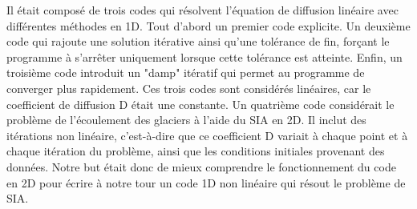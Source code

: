 \documentclass{article}
\begin{document}
 Il était composé de trois codes qui résolvent l'équation de diffusion linéaire avec différentes méthodes en 1D. Tout d'abord un premier code explicite. Un deuxième code qui rajoute une solution itérative ainsi qu'une tolérance de fin, forçant le programme à s'arrêter uniquement lorsque cette tolérance est atteinte. Enfin, un troisième code introduit un "damp" itératif qui permet au programme de converger plus rapidement.
\newline
Ces trois codes sont considérés linéaires, car le coefficient de diffusion D était une constante.
\newline
Un quatrième code considérait le problème de l'écoulement des glaciers à l'aide du SIA en 2D. Il inclut des itérations non linéaire, c'est-à-dire que ce coefficient D variait à chaque point et à chaque itération du problème, ainsi que les conditions initiales provenant des données. Notre but était donc de mieux comprendre le fonctionnement du code en 2D pour écrire à notre tour un code 1D non linéaire qui résout le problème de SIA.
\end{document}

